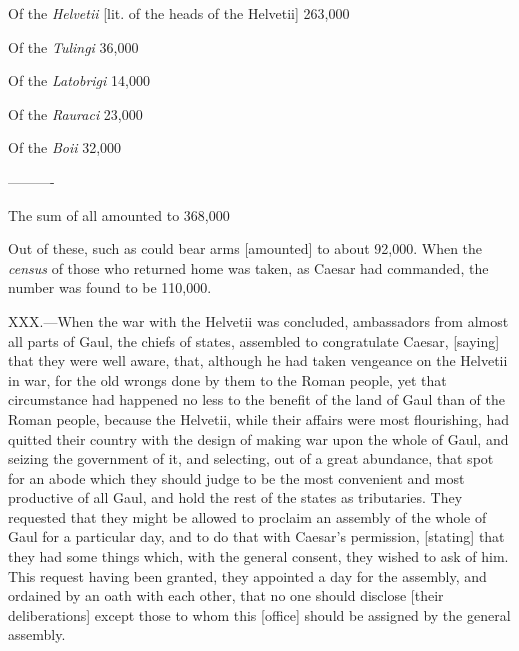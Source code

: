 Of the \emph{Helvetii} [lit. of the heads of the Helvetii] 263,000

Of the \emph{Tulingi} 36,000

Of the \emph{Latobrigi} 14,000

Of the \emph{Rauraci} 23,000

Of the \emph{Boii} 32,000

———-

The sum of all amounted to 368,000

Out of these, such as could bear arms [amounted] to about 92,000. When
the \emph{census} of those who returned home was taken, as Caesar had
commanded, the number was found to be 110,000.

XXX.—When the war with the Helvetii was concluded, ambassadors from
almost all parts of Gaul, the chiefs of states, assembled to
congratulate Caesar, [saying] that they were well aware, that, although
he had taken vengeance on the Helvetii in war, for the old wrongs done
by them to the Roman people, yet that circumstance had happened no less
to the benefit of the land of Gaul than of the Roman people, because the
Helvetii, while their affairs were most flourishing, had quitted their
country with the design of making war upon the whole of Gaul, and
seizing the government of it, and selecting, out of a great abundance,
that spot for an abode which they should judge to be the most convenient
and most productive of all Gaul, and hold the rest of the states as
tributaries. They requested that they might be allowed to proclaim an
assembly of the whole of Gaul for a particular day, and to do that with
Caesar's permission, [stating] that they had some things which, with the
general consent, they wished to ask of him. This request having been
granted, they appointed a day for the assembly, and ordained by an oath
with each other, that no one should disclose [their deliberations]
except those to whom this [office] should be assigned by the general
assembly.

